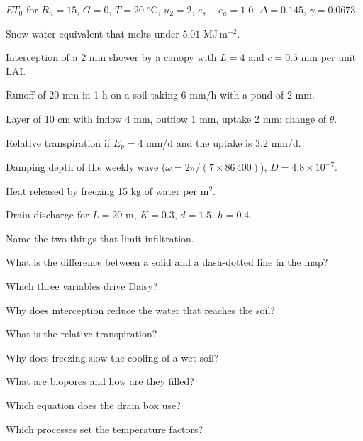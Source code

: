 \begin{exlist}
\item $ET_0$ for $R_n=15$, $G=0$, $T=20$ $^\circ$C, $u_2=2$, $e_s-e_a=1.0$, $\Delta=0.145$, $\gamma=0.0673$.
\item Snow water equivalent that melts under $5.01$ MJ\,m$^{-2}$.\exans{15 mm}
\item Interception of a 2 mm shower by a canopy with $L=4$ and $c=0.5$ mm per unit LAI.
\item Runoff of 20 mm in 1 h on a soil taking 6 mm/h with a pond of 2 mm.\exans{12 mm}
\item Layer of 10 cm with inflow 4 mm, outflow 1 mm, uptake 2 mm: change of $\theta$.
\item Relative transpiration if $E_p=4$ mm/d and the uptake is 3.2 mm/d.
\item Damping depth of the weekly wave ($\omega=2\pi/(7\times86\,400)$), $D=4.8\times10^{-7}$.
\item Heat released by freezing 15 kg of water per m$^2$.
\item Drain discharge for $L=20$ m, $K=0.3$, $d=1.5$, $h=0.4$.
\item Name the two things that limit infiltration.
\end{exlist}

\begin{exlist}
\item What is the difference between a solid and a dash-dotted line in the map?
\item Which three variables drive Daisy?
\item Why does interception reduce the water that reaches the soil?
\item What is the relative transpiration?
\item Why does freezing slow the cooling of a wet soil?
\item What are biopores and how are they filled?
\item Which equation does the drain box use?
\item Which processes set the temperature factors?
\end{exlist}
